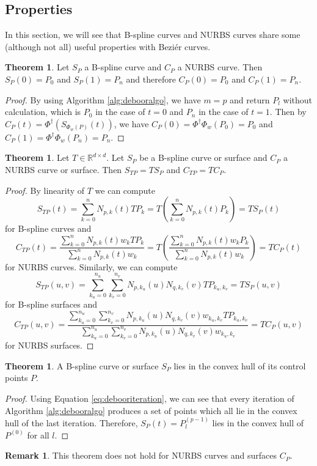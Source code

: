 \documentclass[a4paper, 11pt]{report}
\theoremstyle{definition}
\newtheorem{theorem}[definition]{Theorem}
\newtheorem*{remark}{Remark}
\begin{document}
\subsection{Properties}
	In this section, we will see that B-spline curves and NURBS curves share some (although not all) useful properties with Beziér curves.

	\begin{theorem}
		Let $S_P$ a B-spline curve and $C_P$ a NURBS curve. Then $S_P(0) = P_0$ and $S_P(1) = P_n$ and therefore $C_P(0) = P_0$ and $C_P(1) = P_n$.
	\end{theorem}
	\begin{proof}
		By using Algorithm \ref{alg:debooralgo}, we have $m = p$ and return $P_l$ without calculation, which is $P_0$ in the case of $t = 0$ and $P_n$ in the case of $t = 1$. Then by $C_P(t) = \Phi^\dagger(S_{\Phi_w(P)}(t))$, we have $C_P(0) = \Phi^\dagger\Phi_w(P_0) = P_0$ and $C_P(1) = \Phi^\dagger\Phi_w(P_n) = P_n$.
	\end{proof}

	\begin{theorem}
		Let $T \in \mathbb{R}^{d \times d}$. Let $S_P$ be a B-spline curve or surface and $C_P$ a NURBS curve or surface. Then $S_{TP} = TS_P$ and $C_{TP} = TC_P$.
	\end{theorem}
	\begin{proof}
		By linearity of $T$ we can compute
			$$S_{TP}(t) = \sum_{k=0}^{n} N_{p,k}(t) TP_k = T \left( \sum_{k=0}^{n} N_{p,k}(t) P_k \right) = TS_P(t)$$
		for B-spline curves and
			$$C_{TP}(t) = \frac{\sum_{k=0}^n N_{p,k}(t) w_k TP_k}{\sum_{k=0}^n N_{p,k}(t) w_k} = T \left( \frac{\sum_{k=0}^n N_{p,k}(t) w_k P_k}{\sum_{k=0}^n N_{p,k}(t) w_k} \right) = TC_P(t)$$
		for NURBS curves.
		Similarly, we can compute
			$$ S_{TP}(u,v) = \sum_{k_u=0}^{n_u} \sum_{k_v=0}^{n_v} N_{p,k_u}(u) N_{q,k_v}(v) TP_{k_u,k_v} = TS_P(u,v)$$
		for B-spline surfaces and
			$$ C_{TP}(u,v) = \frac {\sum_{k_u=0}^{n_u} \sum_{k_v=0}^{n_v} N_{p,k_u}(u) N_{q,k_v}(v) w_{k_u, k_v} TP_{k_u,k_v}}{\sum_{k_u=0}^{n_u} \sum_{k_v=0}^{n_v} N_{p,k_u}(u) N_{q,k_v}(v) w_{k_u, k_v}} = TC_P(u,v) $$
		for NURBS surfaces.
	\end{proof}

	\begin{theorem}
		A B-spline curve or surface $S_P$ lies in the convex hull of its control points $P$.
	\end{theorem}
	\begin{proof}
		Using Equation \ref{eq:debooriteration}, we can see that every iteration of Algorithm \ref{alg:debooralgo} produces a set of points which all lie in the convex hull of the last iteration. Therefore, $S_P(t) = P^{(p-1)}_l$ lies in the convex hull of $P^{(0)}$ for all $l$.
	\end{proof}
	\begin{remark}
		This theorem does not hold for NURBS curves and surfaces $C_P$.
	\end{remark}
\end{document}
